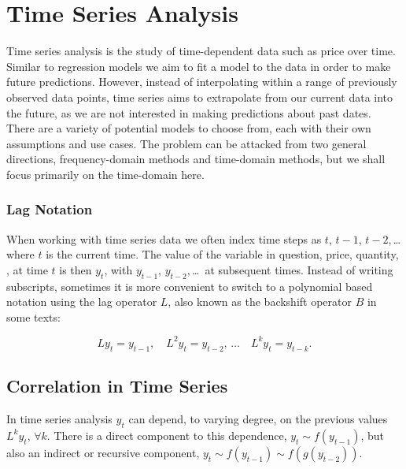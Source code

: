 \section{Time Series Analysis}
\label{additional:time_series}

Time series analysis is the study of time-dependent data such as price over time.
Similar to regression models we aim to fit a model
to the data in order to make future predictions.
However, instead of interpolating within a range of previously observed data points,
time series aims to extrapolate from our current data into the future,
as we are not interested in making predictions about past dates.
There are a variety of potential models to choose from,
each with their own assumptions and use cases.
The problem can be attacked from two general directions,
frequency-domain methods and time-domain methods,
but we shall focus primarily on the time-domain here.

\subsubsection{Lag Notation}
\label{additional:time_series:L}

When working with time series data we often index time steps as $t$, $t-1$, $t-2$,\,\ldots\,
where $t$ is the current time.
The value of the variable in question, price, quantity, \etc,
at time $t$ is then $y_{t}$, with $y_{t-1}$, $y_{t-2}$,\,\ldots\, at subsequent times.
Instead of writing subscripts, sometimes it is more convenient
to switch to a polynomial based notation using
the lag operator $L$, also known as the backshift operator $B$ in some texts:

\begin{equation}\label{eq:time_series:L}
L y_{t} = y_{t-1},\quad L^{2} y_{t} = y_{t-2},\,\ldots \quad L^{k} y_{t} = y_{t-k}.
\end{equation}

\subsection{Correlation in Time Series}
\label{additional:time_series:correlation}

In time series analysis $y_{t}$ can depend, to varying degree,
on the previous values $L^{k} y_{t},\, \forall k$.
There is a direct component to this dependence,
$y_{t} \sim f\left(y_{t-1}\right)$,
but also an indirect or recursive component,
$y_{t} \sim f\left(y_{t-1}\right) \sim f\left(g\left(y_{t-2}\right)\right)$.

